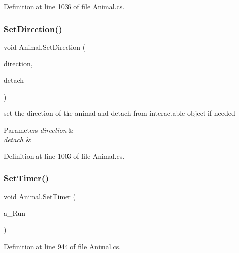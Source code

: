 Definition at line 1036 of file Animal.\+cs.

\mbox{\label{class_animal_ac85273f85e93e6670c2f1346b72be873}} 
\subsubsection{\texorpdfstring{Set\+Direction()}{SetDirection()}}
{\footnotesize\ttfamily void Animal.\+Set\+Direction (\begin{DoxyParamCaption}\item[{\mbox{\hyperlink{_animal_8cs_a57d10208ebba781ae206546ada2002b6}{F\+A\+C\+I\+N\+G\+\_\+\+D\+IR}}}]{direction,  }\item[{bool}]{detach }\end{DoxyParamCaption})}



set the direction of the animal and detach from interactable object if needed 


\begin{DoxyParams}{Parameters}
{\em direction} & \\
\hline
{\em detach} & \\
\hline
\end{DoxyParams}


Definition at line 1003 of file Animal.\+cs.

\mbox{\label{class_animal_a2e31c2fac8842ee6f66e7f79ac99d737}} 
\subsubsection{\texorpdfstring{Set\+Timer()}{SetTimer()}}
{\footnotesize\ttfamily void Animal.\+Set\+Timer (\begin{DoxyParamCaption}\item[{bool}]{a\+\_\+\+Run }\end{DoxyParamCaption})}



Definition at line 944 of file Animal.\+cs.

\mbox{\label{class_animal_a026f551709b7b9c8d22e3ccc47067bec}} 
